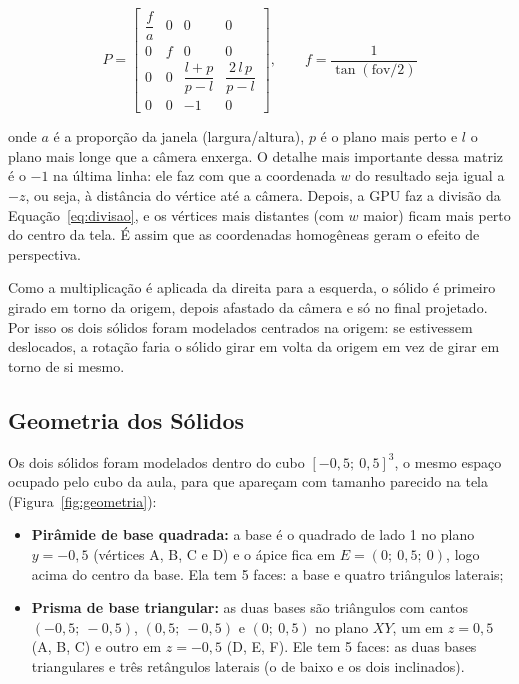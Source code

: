 \documentclass{article}
\begin{document}
\begin{equation}\label{eq:perspectiva}
P = \begin{bmatrix}
\dfrac{f}{a} & 0 & 0 & 0 \\[2mm]
0 & f & 0 & 0 \\[1mm]
0 & 0 & \dfrac{l + p}{p - l} & \dfrac{2\,l\,p}{p - l} \\[3mm]
0 & 0 & -1 & 0
\end{bmatrix}, \qquad f = \frac{1}{\tan(\text{fov}/2)}
\end{equation}

\noindent onde $a$ é a proporção da janela (largura/altura), $p$ é o plano mais perto e $l$ o plano mais longe que a câmera enxerga. O detalhe mais importante dessa matriz é o $-1$ na última linha: ele faz com que a coordenada $w$ do resultado seja igual a $-z$, ou seja, à distância do vértice até a câmera. Depois, a GPU faz a divisão da Equação~\ref{eq:divisao}, e os vértices mais distantes (com $w$ maior) ficam mais perto do centro da tela. É assim que as coordenadas homogêneas geram o efeito de perspectiva.

Como a multiplicação é aplicada da direita para a esquerda, o sólido é primeiro girado em torno da origem, depois afastado da câmera e só no final projetado. Por isso os dois sólidos foram modelados centrados na origem: se estivessem deslocados, a rotação faria o sólido girar em volta da origem em vez de girar em torno de si mesmo.

\subsection{Geometria dos Sólidos}

Os dois sólidos foram modelados dentro do cubo $[-0{,}5;\ 0{,}5]^3$, o mesmo espaço ocupado pelo cubo da aula, para que apareçam com tamanho parecido na tela (Figura~\ref{fig:geometria}):

\begin{itemize}
    \item \textbf{Pirâmide de base quadrada:} a base é o quadrado de lado 1 no plano $y = -0{,}5$ (vértices A, B, C e D) e o ápice fica em $E = (0;\ 0{,}5;\ 0)$, logo acima do centro da base. Ela tem 5 faces: a base e quatro triângulos laterais;
    \item \textbf{Prisma de base triangular:} as duas bases são triângulos com cantos $(-0{,}5;\ -0{,}5)$, $(0{,}5;\ -0{,}5)$ e $(0;\ 0{,}5)$ no plano $XY$, um em $z = 0{,}5$ (A, B, C) e outro em $z = -0{,}5$ (D, E, F). Ele tem 5 faces: as duas bases triangulares e três retângulos laterais (o de baixo e os dois inclinados).
\end{itemize}
\end{document}
